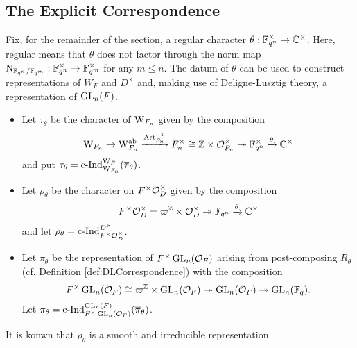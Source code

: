 \documentclass[../main.tex]{subfiles}
\begin{document}
\subsection{The Explicit Correspondence} %
\label{sub:The Explicit Correspondence}
Fix, for the remainder of the section, a regular character $\theta: \mathbb{F}_{q^n}^\times
\to \mathbb{C}^\times$. Here, regular means that $\theta$ does not factor through
the norm map $\mathrm{N}_{\mathbb{F}_{q^n}/\mathbb{F}_{q^m}}: \mathbb{F}_{q^n}^\times \to
\mathbb{F}_{q^m}^\times$ for any $m \leq n$. 
The datum of $\theta$ can be used to construct representations 
of $W_F$ and $D^\times$ and, making use of Deligne-Lusztig
theory, a representation of $\operatorname{GL}_n(F)$.
\begin{itemize}
  \item Let $\bar \tau_\theta$ be the character of $\mathrm W_{F_n}$ given by 
    the composition
    \begin{equation*}
      \mathrm W_{F_n} \to \mathrm W_{F_n}^{\mathrm{ab}} \xrightarrow{\mathrm{Art}_{F_n}^{-1}} F_n^\times \cong
      \mathbb{Z} \times \mathcal{O}_{F_n}^\times \twoheadrightarrow \mathbb{F}_{q^n}^\times \xrightarrow{\theta} \mathbb{C}^\times
    \end{equation*}
  and put $\tau_\theta = \mathrm{c\text{-}Ind}_{\mathrm W_{F_n}}^{\mathrm W_F}(\overline \tau_\theta)$.
  \item Let $\bar \rho_\theta$ be the character on 
    $F^\times \mathcal{O}_D^\times$ given by the composition
    \begin{equation*}
      F^\times\mathcal{O}_D^\times = \varpi^{\mathbb{Z}} \times \mathcal{O}_D^\times \twoheadrightarrow 
      \mathbb{F}_{q^n} \xrightarrow{\theta} \mathbb{C}^\times
    \end{equation*}
    and let $\rho_\theta = \mathrm{c\text{-}Ind}_{F^\times \mathcal{O}_D^\times}^{D^\times}$. 
  \item Let $\bar \pi_\theta$ be the representation of $F^\times \operatorname{GL}_n(\mathcal{O}_F)$
    arising from post-composing $R_\theta$ (cf. Definition
    \ref{def:DLCorrespondence}) with the composition
    \begin{equation*}
      F^\times \operatorname{GL}_n(\mathcal{O}_F) \cong \varpi^{\mathbb{Z}} \times \operatorname{GL}_n(\mathcal{O}_F)
      \twoheadrightarrow \operatorname{GL}_n(\mathcal{O}_F) \twoheadrightarrow \operatorname{GL}_n(\mathbb{F}_q).
    \end{equation*}
    Let $\pi_\theta = \mathrm{c\text{-}Ind}_{F^\times \operatorname{GL}_n(\mathcal{O}_F)}^{\operatorname{GL}_n(F)}(\overline \pi_\theta)$. 
\end{itemize}
It is konwn that $\rho_\theta$  is a smooth and 
irreducible representation. 
\end{document}
